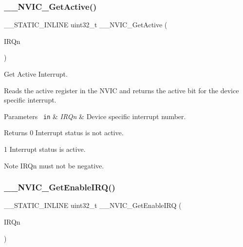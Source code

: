 \subsubsection{\texorpdfstring{\_\_NVIC\_GetActive()}{\_\_NVIC\_GetActive()}}
{\footnotesize\ttfamily \+\_\+\+\_\+\+S\+T\+A\+T\+I\+C\+\_\+\+I\+N\+L\+I\+NE uint32\+\_\+t \+\_\+\+\_\+\+N\+V\+I\+C\+\_\+\+Get\+Active (\begin{DoxyParamCaption}\item[{\mbox{\hyperlink{group___configuration__section__for___c_m_s_i_s_ga7e1129cd8a196f4284d41db3e82ad5c8}{I\+R\+Qn\+\_\+\+Type}}}]{I\+R\+Qn }\end{DoxyParamCaption})}



Get Active Interrupt. 

Reads the active register in the N\+V\+IC and returns the active bit for the device specific interrupt. 
\begin{DoxyParams}[1]{Parameters}
\mbox{\texttt{ in}}  & {\em I\+R\+Qn} & Device specific interrupt number. \\
\hline
\end{DoxyParams}
\begin{DoxyReturn}{Returns}
0 Interrupt status is not active. 

1 Interrupt status is active. 
\end{DoxyReturn}
\begin{DoxyNote}{Note}
I\+R\+Qn must not be negative. 
\end{DoxyNote}
\mbox{\label{group___c_m_s_i_s___core___n_v_i_c_functions_gaaeb5e7cc0eaad4e2817272e7bf742083}} 
\subsubsection{\texorpdfstring{\_\_NVIC\_GetEnableIRQ()}{\_\_NVIC\_GetEnableIRQ()}}
{\footnotesize\ttfamily \+\_\+\+\_\+\+S\+T\+A\+T\+I\+C\+\_\+\+I\+N\+L\+I\+NE uint32\+\_\+t \+\_\+\+\_\+\+N\+V\+I\+C\+\_\+\+Get\+Enable\+I\+RQ (\begin{DoxyParamCaption}\item[{\mbox{\hyperlink{group___configuration__section__for___c_m_s_i_s_ga7e1129cd8a196f4284d41db3e82ad5c8}{I\+R\+Qn\+\_\+\+Type}}}]{I\+R\+Qn }\end{DoxyParamCaption})}



